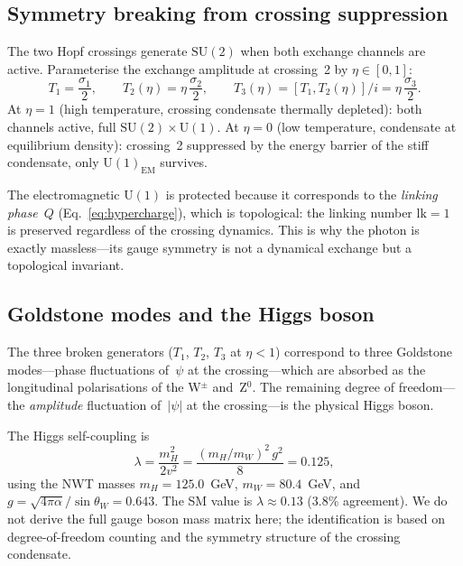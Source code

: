\documentclass[11pt,a4paper]{article}
\begin{document}
\subsection{Symmetry breaking from crossing suppression}

The two Hopf crossings generate $\mathrm{SU}(2)$ when both
exchange channels are active.  Parameterise the exchange
amplitude at crossing~2 by $\eta \in [0,1]$:
\begin{equation}
  T_1 = \frac{\sigma_1}{2}, \qquad
  T_2(\eta) = \eta\,\frac{\sigma_2}{2}, \qquad
  T_3(\eta) = [T_1, T_2(\eta)]/i = \eta\,\frac{\sigma_3}{2}.
  \label{eq:partial}
\end{equation}
At $\eta = 1$ (high temperature, crossing condensate thermally
depleted): both channels active, full $\mathrm{SU}(2) \times
\mathrm{U}(1)$.  At $\eta = 0$ (low temperature, condensate at
equilibrium density): crossing~2 suppressed by the energy barrier
of the stiff condensate, only $\mathrm{U}(1)_{\text{EM}}$
survives.

The electromagnetic $\mathrm{U}(1)$ is protected because it
corresponds to the \emph{linking phase}~$Q$
(Eq.~\ref{eq:hypercharge}), which is topological: the linking
number $\mathrm{lk} = 1$ is preserved regardless of the
crossing dynamics.  This is why the photon is exactly
massless---its gauge symmetry is not a dynamical exchange but
a topological invariant.

\subsection{Goldstone modes and the Higgs boson}

The three broken generators ($T_1$, $T_2$, $T_3$ at $\eta < 1$)
correspond to three Goldstone modes---phase fluctuations of~$\psi$
at the crossing---which are absorbed as the longitudinal
polarisations of the W$^\pm$ and~Z$^0$.  The remaining
degree of freedom---the \emph{amplitude} fluctuation
of~$|\psi|$ at the crossing---is the physical Higgs boson.

The Higgs self-coupling is
\begin{equation}
  \lambda = \frac{m_H^2}{2v^2}
    = \frac{(m_H/m_W)^2\,g^2}{8}
    = 0.125,
  \label{eq:lambda}
\end{equation}
using the NWT masses $m_H = 125.0$~GeV, $m_W = 80.4$~GeV, and
$g = \sqrt{4\pi\alpha}/\sin\theta_W = 0.643$.  The SM value is
$\lambda \approx 0.13$ ($3.8\%$ agreement).  We do not derive
the full gauge boson mass matrix here; the identification is based
on degree-of-freedom counting and the symmetry structure of the
crossing condensate.
\end{document}
